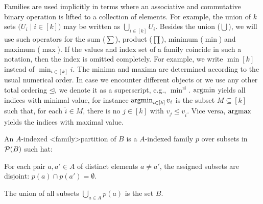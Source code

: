 \documentclass[../document.tex]{subfiles}
\begin{document}
    Families are used implicitly in terms where an associative and commutative binary operation is lifted to a collection of elements.
    For example, the union of \(k\) sets \(\big(U_i \mid i \in [k]\big)\) may be written as \(\bigcup_{i \in [k]} U_i\).
    Besides the union (\(\bigcup\)), we will use such operators for the sum (\(\sum\)), product (\(\prod\)), minimum (\(\min\)) and maximum (\(\max\)).
    If the values and index set of a family coincide in such a notation, then the index is omitted completely.
    For example, we write \(\min [k]\) instead of \(\min_{i \in [k]} i\).
    The minima and maxima are determined according to the usual numerical order.
    In case we encounter different objects or we use any other total ordering \(\unlhd\), we denote it as a superscript, e.g., \(\min^{\unlhd}\).
    \(\operatorname{arg min}\) yields all indices with minimal value, for instance \(\operatorname{arg min}_{i \in [k]} v_i\) is the subset \(M \subseteq [k]\) such that, for each \(\hat{i} \in M\), there is no \(j \in [k]\) with \(v_j \unlhd v_{\hat{i}}\).
    Vice versa, \(\operatorname{arg max}\) yields the indices with maximal value.

    An \(A\)-indexed <family>{partition} of \(B\) is a \(A\)-indexed family \(p\) over subsets in \(\mathcal{P}(B)\) such hat:
    \begin{inparaenum}
        \item For each pair \(a, a' \in A\) of distinct elements \(a \neq a'\), the assigned subsets are disjoint: \(p(a) \cap p(a') = \emptyset\).
        \item The union of all subsets \(\bigcup_{a \in A} p(a)\) is the set \(B\).
    \end{inparaenum}
\end{document}
